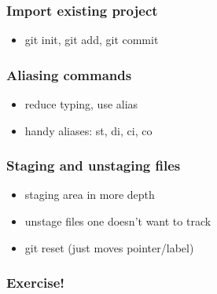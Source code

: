 \begin{frame}
\frametitle{Import existing project}
\begin{itemize}
    \item git init, git add, git commit
\end{itemize}
\end{frame}

\begin{frame}
\frametitle{Aliasing commands}
\begin{itemize}
    \item reduce typing, use alias
    \item handy aliases: st, di, ci, co
\end{itemize}
\end{frame}

\begin{frame}
\frametitle{Staging and unstaging files}
\begin{itemize}
    \item staging area in more depth
    \item unstage files one doesn't want to track
    \item git reset (just moves pointer/label)
\end{itemize}
\end{frame}

\begin{frame}
\frametitle{Exercise!}
\end{frame}
